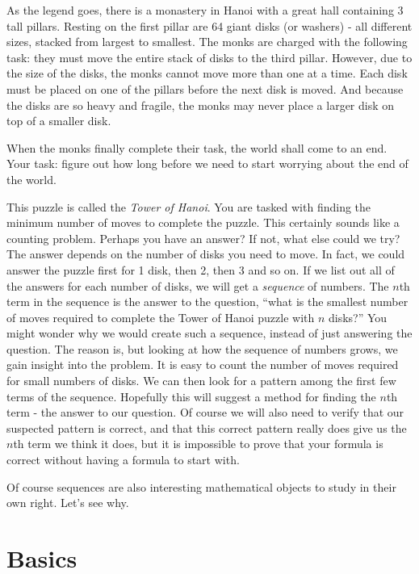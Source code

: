 \documentclass[12pt]{article}
\begin{document}
As the legend goes, there is a monastery in Hanoi with a great hall containing 3 tall pillars.  Resting on the first pillar are 64 giant disks (or washers) - all different sizes, stacked from largest to smallest.  The monks are charged with the following task: they must move the entire stack of disks to the third pillar.  However, due to the size of the disks, the monks cannot move more than one at a time.  Each disk must be placed on one of the pillars before the next disk is moved.  And because the disks are so heavy and fragile, the monks may never place a larger disk on top of a smaller disk.

When the monks finally complete their task, the world shall come to an end.  Your task: figure out how long before we need to start worrying about the end of the world.


This puzzle is called the {\em Tower of Hanoi}.  You are tasked with finding the minimum number of moves to complete the puzzle.  This certainly sounds like a counting problem.  Perhaps you have an answer?  If not, what else could we try?  The answer depends on the number of disks you need to move.  In fact, we could answer the puzzle first for 1 disk, then 2, then 3 and so on.  If we list out all of the answers for each number of disks, we will get a {\em sequence} of numbers.  The $n$th term in the sequence is the answer to the question, ``what is the smallest number of moves required to complete the Tower of Hanoi puzzle with $n$ disks?''  You might wonder why we would create such a sequence, instead of just answering the question.  The reason is, but looking at how the sequence of numbers grows, we gain insight into the problem.  It is easy to count the number of moves required for small numbers of disks.  We can then look for a pattern among the first few terms of the sequence.  Hopefully this will suggest a method for finding the $n$th term - the answer to our question.  Of course we will also need to verify that our suspected pattern is correct, and that this correct pattern really does give us the $n$th term we think it does, but it is impossible to prove that your formula is correct without having a formula to start with.  

Of course sequences are also interesting mathematical objects to study in their own right. Let's see why.

\section{Basics}
\end{document}
